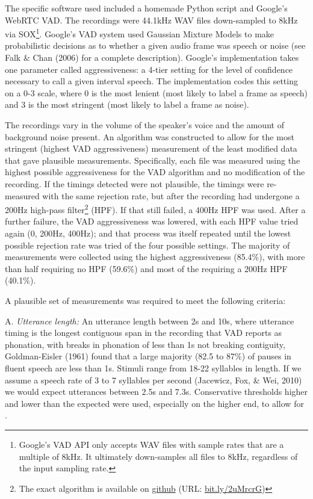 \documentclass[12pt,oneside]{book}
\let\rmarkdownfootnote\footnote%
\def\footnote{\protect\rmarkdownfootnote}
\begin{document}
The specific software used included a homemade Python script and Google's WebRTC VAD. The recordings were 44.1kHz WAV files down-sampled to 8kHz via SOX\footnote{Google's VAD API only accepts WAV files with sample rates that are a multiple of 8kHz. It ultimately down-samples all files to 8kHz, regardless of the input sampling rate.}. Google's VAD system used Gaussian Mixture Models to make probabilistic decisions as to whether a given audio frame was speech or noise (see Falk \& Chan (2006) for a complete description). Google's implementation takes one parameter called aggressiveness: a 4-tier setting for the level of confidence necessary to call a given interval speech. The implementation codes this setting on a 0-3 scale, where 0 is the most lenient (most likely to label a frame as speech) and 3 is the most stringent (most likely to label a frame as noise).

The recordings vary in the volume of the speaker's voice and the amount of background noise present. An algorithm was constructed to allow for the most stringent (highest VAD aggressiveness) measurement of the least modified data that gave plausible measurements. Specifically, each file was measured using the highest possible aggressiveness for the VAD algorithm and no modification of the recording. If the timings detected were not plausible, the timings were re-measured with the same rejection rate, but after the recording had undergone a 200Hz high-pass filter\footnote{The exact algorithm is available on \href{https://gist.github.com/moui72/4ebc4eb8f69eb9fdb1cab160ce299675}{github} (URL: \href{https://bit.ly/2uMrcrG}{bit.ly/2uMrcrG})} (HPF). If that still failed, a 400Hz HPF was used. After a further failure, the VAD aggressiveness was lowered, with each HPF value tried again (0, 200Hz, 400Hz); and that process was itself repeated until the lowest possible rejection rate was tried of the four possible settings. The majority of measurements were collected using the highest aggressiveness (85.4\%), with more than half requiring no HPF (59.6\%) and most of the  requiring a 200Hz HPF (40.1\%).

A plausible set of measurements was required to meet the following criteria:

A. \emph{Utterance length:} An utterance length between 2s and 10s, where utterance timing is the longest contiguous span in the recording that VAD reports as phonation, with breaks in phonation of less than 1s not breaking contiguity,  Goldman-Eisler (1961) found that a large majority (82.5 to 87\%) of pauses in fluent speech are less than 1s. Stimuli range from 18-22 syllables in length. If we assume a speech rate of 3 to 7 syllables per second (Jacewicz, Fox, \& Wei, 2010) we would expect utterances between 2.5s and 7.3s. Conservative thresholds higher and lower than the expected were used, especially on the higher end, to allow for .
\end{document}
